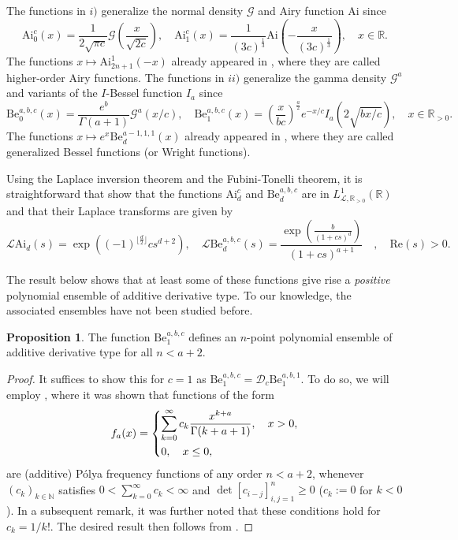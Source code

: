 \documentclass[a4paper,12pt,oneside]{article}
\theoremstyle{definition}
\newtheorem{prop}[defi]{Proposition}
\newcommand{\N}{\mathbb{N}}
\newcommand{\Z}{\mathbb{Z}}
\newcommand{\R}{\mathbb{R}}
\newcommand{\LT}[1]{\mathcal{L}#1}
\begin{document}
The functions in $i)$ generalize the normal density $\mathcal{G}$ and Airy function $\text{Ai}$ since 
$$\text{Ai}_0^c(x) = \frac{1}{2\sqrt{\pi c}} \mathcal{G}(\frac{x}{\sqrt{2c}}) ,\quad \text{Ai}_1^c(x) = \frac{1}{(3c)^{\frac{1}{3}}} \text{Ai}(-\frac{x}{(3c)^{\frac{1}{3}}}),\quad x\in\R.$$ 
The functions $x\mapsto \text{Ai}_{2n+1}^1(-x)$ already appeared in \cite{HZ:Ai_gen}, where they are called higher-order Airy functions. The functions in $ii)$ generalize the gamma density $\mathcal{G}^a$ and variants of the $I$-Bessel function $I_a$ since
$$\text{Be}_0^{a,b,c}(x) = \frac{e^b}{\Gamma(a+1)}\mathcal{G}^a(x/c),\quad \text{Be}_1^{a,b,c}(x) = \left(\frac{x}{bc}\right)^{\frac{a}{2}} e^{-x/c} I_{a}(2\sqrt{bx/c}) ,\quad x\in\R_{>0}.$$
The functions $x\mapsto e^{x}\text{Be}_d^{a-1,1,1}(x)$ already appeared in \cite[Eq. 10.46.1]{DLMF}, where they are called generalized Bessel functions (or Wright functions).
\medbreak

Using the Laplace inversion theorem and the Fubini-Tonelli theorem, it is straightforward that show that the functions $\text{Ai}_{d}^c$ and $\text{Be}_{d}^{a,b,c}$ are in $L^1_{\LT{},\R_{>0}}(\R)$ and that their Laplace transforms are given by
    $$\LT{\text{Ai}_{d}}(s) = \exp\left( (-1)^{\lfloor \frac{d}{2} \rfloor} c s^{d+2} \right),\quad \LT{\text{Be}_{d}^{a,b,c}}(s) = \dfrac{\exp\left(\frac{b}{(1+cs)^{d}}\right)}{(1+cs)^{a+1}} \quad,\quad \text{Re}(s)>0.$$
\medbreak

The result below shows that at least some of these functions give rise a \textit{positive} polynomial ensemble of additive derivative type. To our knowledge, the associated ensembles have not been studied before.

\begin{prop}
    The function $\text{Be}_{1}^{a,b,c}$ defines an $n$-point polynomial ensemble of additive derivative type for all $n<a+2$.
\end{prop}
\begin{proof}
    It suffices to show this for $c=1$ as $\text{Be}_{1}^{a,b,c} = \mathcal{D}_c\text{Be}_{1}^{a,b,1}$. To do so, we will employ \cite[\S 3.2: Thm. 2.1]{Karlin}, where it was shown that functions of the form
    $$ f_a(x) = \begin{dcases}
        \sum_{k=0}^{\infty} c_k \frac{x^{k+a}}{\Gamma(k+a+1)},\quad x>0, \\
        0,\quad x\leq 0,
    \end{dcases}$$
    are (additive) Pólya frequency functions of any order $n<a+2$, whenever $(c_k)_{k\in\N}$ satisfies $0<\sum_{k=0}^{\infty} c_k <\infty$ and $\det[c_{i-j}]_{i,j=1}^n\geq 0$ ($c_k:=0$ for $k<0$). In a subsequent remark, it was further noted that these conditions hold for $c_k=1/k!$. %
    The desired result then follows from \cite[Thm. 2.9 (1)]{FKK:PolyaE}.
\end{proof}
\end{document}
